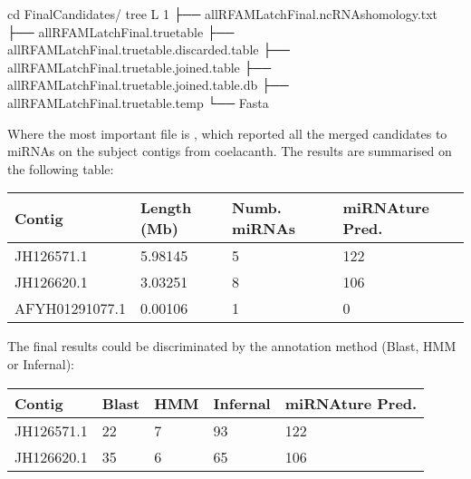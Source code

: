 \documentclass[letterpaper,10pt,english]{sphinxmanual}
\begin{document}
\begin{sphinxVerbatim}[commandchars=\\\{\}]
\PYGZdl{} cd Final\PYGZus{}Candidates/
\PYGZdl{} tree \PYGZhy{}L 1
├── all\PYGZus{}RFAM\PYGZus{}Latch\PYGZus{}Final.ncRNAs\PYGZus{}homology.txt
├── all\PYGZus{}RFAM\PYGZus{}Latch\PYGZus{}Final.truetable
├── all\PYGZus{}RFAM\PYGZus{}Latch\PYGZus{}Final.truetable.discarded.table
├── all\PYGZus{}RFAM\PYGZus{}Latch\PYGZus{}Final.truetable.joined.table
├── all\PYGZus{}RFAM\PYGZus{}Latch\PYGZus{}Final.truetable.joined.table.db
├── all\PYGZus{}RFAM\PYGZus{}Latch\PYGZus{}Final.truetable.temp
└── Fasta
\end{sphinxVerbatim}

Where the most important file is ,
which reported all the merged candidates to miRNAs on the subject contigs
from coelacanth. The results are summarised on the following table:


\begin{savenotes}\sphinxattablestart
\centering
\begin{tabulary}{\linewidth}[t]{|T|T|T|T|}
\hline
\sphinxstyletheadfamily 
Contig
&\sphinxstyletheadfamily 
Length (Mb)
&\sphinxstyletheadfamily 
Numb. miRNAs
&\sphinxstyletheadfamily 
miRNAture Pred.
\\
\hline
JH126571.1
&
5.98145
&
5
&
122
\\
\hline
JH126620.1
&
3.03251
&
8
&
106
\\
\hline
AFYH01291077.1
&
0.00106
&
1
&
0
\\
\hline
\end{tabulary}
\par
\sphinxattableend\end{savenotes}

The final results could be discriminated by the annotation method (Blast, HMM or
Infernal):


\begin{savenotes}\sphinxattablestart
\centering
\begin{tabulary}{\linewidth}[t]{|T|T|T|T|T|}
\hline
\sphinxstyletheadfamily 
Contig
&\sphinxstyletheadfamily 
Blast
&\sphinxstyletheadfamily 
HMM
&\sphinxstyletheadfamily 
Infernal
&\sphinxstyletheadfamily 
miRNAture Pred.
\\
\hline
JH126571.1
&
22
&
7
&
93
&
122
\\
\hline
JH126620.1
&
35
&
6
&
65
&
106
\\
\hline
\end{tabulary}
\par
\sphinxattableend\end{savenotes}
\end{document}
